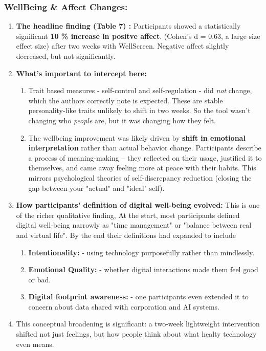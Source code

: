 \documentclass[12pt]{article}
\begin{document}
\subsubsection{WellBeing \& Affect Changes: }
\begin{enumerate}
    \item \textbf{The headline finding (Table 7) : } Participants showed a statistically significant \textbf{10 \% increase in positve affect}. (Cohen's d = 0.63, a large size effect size) after two weeks with WellScreen. Negative affect slightly decreased, but not significantly.
    \item \textbf{What's important to intercept here: }
    \begin{enumerate}
        \item Trait based measures - self-control and self-regulation - did \textit{not} change, which the authors correctly note is expected. These are stable personality-like traits unlikely to shift in two weeks. So the tool wasn't changing who \textit{people} are, but it was changing how they felt.
        \item The wellbeing improvement was likely driven by \textbf{shift in emotional interpretation} rather than actual behavior change. Participants describe a process of meaning-making  -- they reflected on their usage, justified it to themselves, and came away feeling more at peace with their habits. This mirrors psychological theories of self-discrepancy reduction (closing the gap between your "actual" and "ideal" self).
    \end{enumerate}
    \item \textbf{How participants' definition of digital well-being evolved: } This is one of the richer qualitative finding, At the start, most participants defined digital well-being narrowly as "time management" or "balance between real and virtual life". By the end their definitions had expanded to include 
    \begin{enumerate}
        \item \textbf{Intentionality: } - using technology purposefully rather than mindlessly.
        \item \textbf{Emotional Quality: } - whether digital interactions made them feel good or bad.
        \item \textbf{Digital footprint awareness: } - one participants even extended it to concern about data shared with corporation and AI systems.
    \end{enumerate}
    \item This conceptual broadening is significant: a two-week lightweight intervention shifted not just feelings, but how people think about what healty technology even means.
\end{enumerate}
\end{document}
